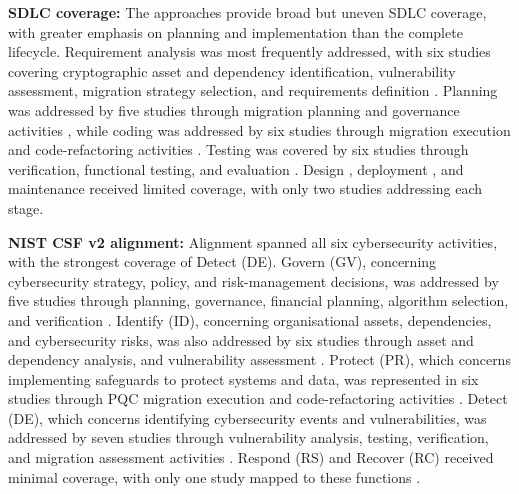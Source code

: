 \documentclass[letterpaper,twocolumn,10pt]{article}
\begin{document}
\textbf{SDLC coverage: } The approaches provide broad but uneven SDLC coverage, with greater emphasis on planning and implementation than the complete lifecycle. Requirement analysis was most frequently addressed, with six studies covering cryptographic asset and dependency identification, vulnerability assessment, migration strategy selection, and requirements definition \cite{Ana_MigFrDepen, Ana_MigFrameOrg, Ana_PMMP, Ana_FinanceMig, Ana_rattanavipanon_toolchain_2025, Ana_legacyToQuantumConvert}. Planning was addressed by five studies through migration planning and governance activities \cite{Ana_MigFrDepen, Ana_MigFrameOrg, Ana_PMMP, Ana_FinanceMig, Ana_legacyToQuantumConvert}, while coding was addressed by six studies through migration execution and code-refactoring activities \cite{Ana_MigFrDepen, Ana_MigFrameOrg, Ana_PMMP, Ana_android_Migr, Ana_ccPASTpqc, Ana_legacyToQuantumConvert}. Testing was covered by six studies through verification, functional testing, and evaluation \cite{Ana_MigFrDepen, Ana_MigFrameOrg, Ana_PMMP, Ana_FinanceMig, Ana_e27020212, Ana_rattanavipanon_toolchain_2025}. Design \cite{Ana_MigFrDepen, Ana_decisionAlgo}, deployment \cite{Ana_MigFrameOrg, Ana_FinanceMig}, and maintenance \cite{Ana_MigFrDepen, Ana_MigFrameOrg} received limited coverage, with only two studies addressing each stage. 

\textbf{NIST CSF v2 alignment:} Alignment spanned all six cybersecurity activities, with the strongest coverage of Detect (DE). Govern (GV), concerning cybersecurity strategy, policy, and risk-management decisions, was addressed by five studies through planning, governance, financial planning, algorithm selection, and verification \cite{Ana_MigFrDepen, Ana_MigFrameOrg, Ana_PMMP, Ana_FinanceMig, Ana_decisionAlgo}. Identify (ID), concerning organisational assets, dependencies, and cybersecurity risks, was also addressed by six studies through asset and dependency analysis, and vulnerability assessment \cite{Ana_MigFrDepen, Ana_MigFrameOrg, Ana_PMMP, Ana_FinanceMig, Ana_rattanavipanon_toolchain_2025, Ana_ccPASTpqc}. Protect (PR), which concerns implementing safeguards to protect systems and data, was represented in six studies through PQC migration execution and code-refactoring activities \cite{Ana_MigFrDepen, Ana_MigFrameOrg, Ana_FinanceMig, Ana_ccPASTpqc, Ana_legacyToQuantumConvert, Ana_android_Migr}. Detect (DE), which concerns identifying cybersecurity events and vulnerabilities, was addressed by seven studies through vulnerability analysis, testing, verification, and migration assessment activities \cite{Ana_MigFrDepen, Ana_MigFrameOrg, Ana_PMMP, Ana_FinanceMig, Ana_rattanavipanon_toolchain_2025, Ana_e27020212, Ana_legacyToQuantumConvert}. Respond (RS) and Recover (RC) received minimal coverage, with only one study mapped to these functions \cite{Ana_MigFrDepen}.
\end{document}

